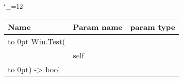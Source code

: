 \begingroup \catcode`\_=12 \tt
\begin{tabular}{lll}
\toprule
\textrm{Name}&\textrm{Param name}&\textrm{param type}\\
\midrule
\hbox to 0pt {Win.Test(\hss}\\
& self\\
\hbox to 0pt{) -> bool\hss}\\
\bottomrule
\end{tabular}
\endgroup
